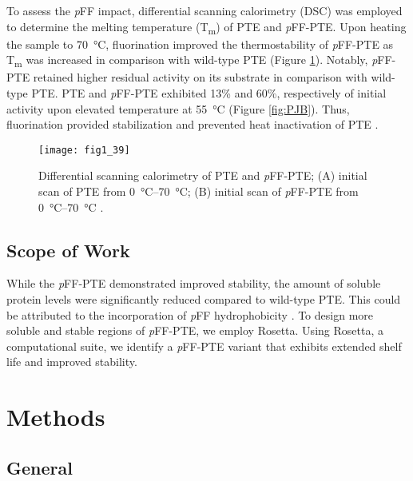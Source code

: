 \begin{refsection}
To assess the \emph{p}FF impact, differential scanning calorimetry (DSC) was
employed to determine the melting temperature (T\textsubscript{m}) of PTE and
\emph{p}FF-PTE. Upon heating the sample to \SI{70}{\celsius}, fluorination
improved the thermostability of \emph{p}FF-PTE as T\textsubscript{m} was
increased in comparison with wild-type PTE \cite{Baker2011b} (Figure
\ref{fig:PJB-DSC}).  Notably, \emph{p}FF-PTE retained higher residual activity
on its substrate in comparison with wild-type PTE. PTE and \emph{p}FF-PTE
exhibited 13\% and 60\%, respectively of initial activity upon elevated
temperature at \SI{55}{\celsius} (Figure \ref{fig:PJB}). Thus, fluorination
provided stabilization and prevented heat inactivation of PTE \cite{Baker2011b}.
\begin{figure}[htbp] \centering \texttt{[image: fig1\_39]}
    \caption[Differential scanning calorimetry of PTE and \emph{p}FF-PTE; (A)
    initial scan of PTE at \SIrange{0}{70}{\celsius}; (B) initial scan of
\emph{p}FF-PTE at \SIrange{0}{70}{\celsius}.]{Differential scanning calorimetry
    of PTE and \emph{p}FF-PTE; (A) initial scan of PTE from
    \SIrange{0}{70}{\celsius}; (B) initial scan of \emph{p}FF-PTE from
    \SIrange{0}{70}{\celsius} \cite{Baker2011b}.} \label{fig:PJB-DSC}
\end{figure}

\subsection{Scope of Work}

While the \emph{p}FF-PTE demonstrated improved stability, the amount of soluble
protein levels were significantly reduced compared to wild-type PTE. This could
be attributed to the incorporation of \emph{p}FF hydrophobicity
\cite{Baker2011b}. To design more soluble and stable regions of \emph{p}FF-PTE,
we employ Rosetta. Using Rosetta, a computational suite, we identify a
\emph{p}FF-PTE variant that exhibits extended shelf life and improved
stability. 

\section{Methods}

\subsection{General}


\end{refsection}
